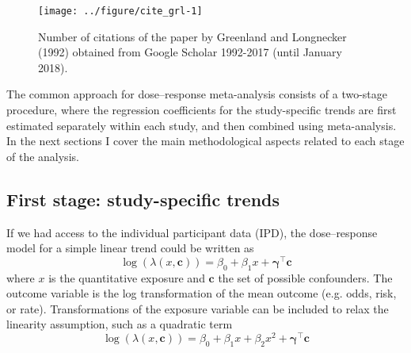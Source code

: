 \documentclass[11pt,a4paper,twoside,openany]{book}\usepackage{knitr}
\begin{document}
{{\begin{knitrout}\footnotesize
{}\color{fgcolor}\begin{figure}[ht!]

{\centering \texttt{[image: ../figure/cite\_grl-1]} 

}

\caption[Number of citations of the paper by Greenland and Longnecker (1992) obtained from Google Scholar 1992-2017 (until January 2018)]{Number of citations of the paper by Greenland and Longnecker (1992) obtained from Google Scholar 1992-2017 (until January 2018).}\label{fig:cite_grl}
\end{figure}


\end{knitrout}

The common approach for dose--response meta-analysis consists of a two-stage procedure, where the regression coefficients for the study-specific trends are first estimated separately within each study, and then combined using meta-analysis. In the next sections I cover the main methodological aspects related to each stage of the analysis.


\subsection{First stage: study-specific trends}\label{sec:1st_stage}

If we had access to the individual participant data (IPD), the dose--response model for a simple linear trend could be written as
\begin{equation}
\log \left( \lambda \left(x, \mathbf{c} \right) \right) =  \beta_0 + \beta_1x + \boldsymbol{\gamma}^\top \mathbf{c}
\label{eq:lin_ipd}
\end{equation}
\noindent where $x$ is the quantitative exposure and $\mathbf{c}$ the set of possible confounders. The outcome variable is the log transformation of the mean outcome (e.g. odds, risk, or rate). Transformations of the exposure variable can be included to relax the linearity assumption, such as a quadratic term
\begin{equation}
\log \left( \lambda \left(x, \mathbf{c} \right) \right) =  \beta_0 + \beta_1x + \beta_2x^2 + \boldsymbol{\gamma}^\top \mathbf{c}
\label{eq:quadr_ipd}
\end{equation}

}}
\end{document}
